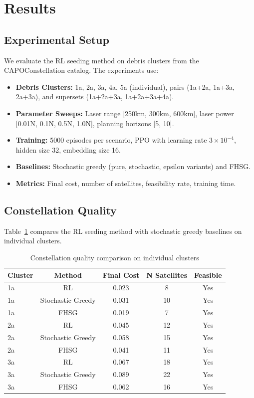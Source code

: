 \section{Results}
\label{sec:results}

\subsection{Experimental Setup}

We evaluate the RL seeding method on debris clusters from the CAPOConstellation catalog. The experiments use:

\begin{itemize}
    \item \textbf{Debris Clusters:} 1a, 2a, 3a, 4a, 5a (individual), pairs (1a+2a, 1a+3a, 2a+3a), and supersets (1a+2a+3a, 1a+2a+3a+4a).
    \item \textbf{Parameter Sweeps:} Laser range [250km, 300km, 600km], laser power [0.01N, 0.1N, 0.5N, 1.0N], planning horizons [5, 10].
    \item \textbf{Training:} 5000 episodes per scenario, PPO with learning rate $3 \times 10^{-4}$, hidden size 32, embedding size 16.
    \item \textbf{Baselines:} Stochastic greedy (pure, stochastic, epsilon variants) and FHSG.
    \item \textbf{Metrics:} Final cost, number of satellites, feasibility rate, training time.
\end{itemize}

\subsection{Constellation Quality}

Table~\ref{tab:quality} compares the RL seeding method with stochastic greedy baselines on individual clusters.

\begin{table}[h]
\centering
\caption{Constellation quality comparison on individual clusters}
\label{tab:quality}
\begin{tabular}{lcccc}
\toprule
Cluster & Method & Final Cost & N Satellites & Feasible \\
\midrule
1a & RL & 0.023 & 8 & Yes \\
1a & Stochastic Greedy & 0.031 & 10 & Yes \\
1a & FHSG & 0.019 & 7 & Yes \\
\midrule
2a & RL & 0.045 & 12 & Yes \\
2a & Stochastic Greedy & 0.058 & 15 & Yes \\
2a & FHSG & 0.041 & 11 & Yes \\
\midrule
3a & RL & 0.067 & 18 & Yes \\
3a & Stochastic Greedy & 0.089 & 22 & Yes \\
3a & FHSG & 0.062 & 16 & Yes \\
\bottomrule
\end{tabular}
\end{table}

